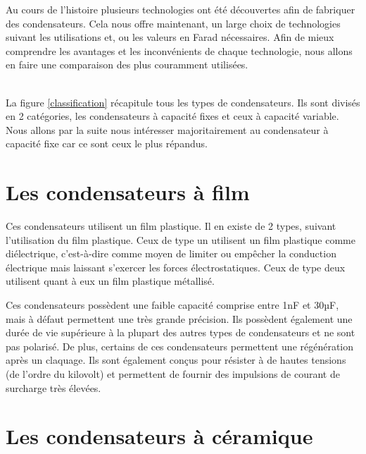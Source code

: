 Au cours de l’histoire plusieurs technologies ont été découvertes afin de fabriquer des condensateurs. Cela nous offre maintenant, un large choix de technologies suivant les utilisations et, ou les valeurs en Farad nécessaires. Afin de mieux comprendre les avantages et les inconvénients de chaque technologie, nous allons en faire une comparaison des plus couramment utilisées. \\ \\



La figure \ref{classification} récapitule tous les types de condensateurs. Ils sont divisés en 2 catégories, les condensateurs à capacité fixes et ceux à capacité variable. Nous allons par la suite nous intéresser majoritairement au condensateur à capacité fixe car ce sont ceux le plus répandus.

\section{Les condensateurs à film}


Ces condensateurs utilisent un film plastique. Il en existe de 2 types, suivant l’utilisation du film plastique.  Ceux de type un utilisent un film plastique comme diélectrique, c’est-à-dire comme moyen de limiter ou empêcher la conduction électrique mais laissant s’exercer les forces électrostatiques. Ceux de type deux utilisent quant à eux un film plastique métallisé. \\



Ces condensateurs possèdent une faible capacité comprise entre 1nF et 30µF, mais à défaut permettent une très grande précision. 
Ils possèdent également une durée de vie supérieure à la plupart des autres types de condensateurs et ne sont pas polarisé. 
De plus, certains de ces condensateurs permettent une régénération après un claquage. 
Ils sont également conçus pour résister à de hautes tensions (de l’ordre du kilovolt) et permettent de fournir des impulsions de courant de surcharge très élevées.

\newpage
\section{Les condensateurs à céramique}

